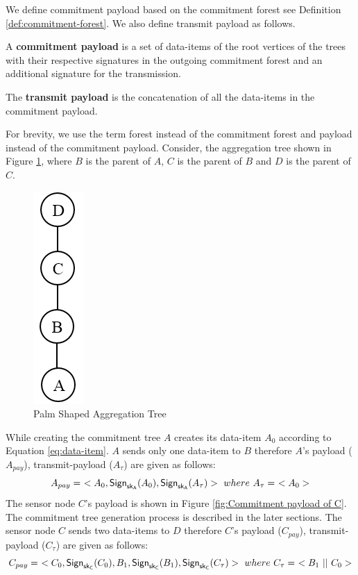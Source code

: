 	We define commitment payload based on the commitment forest see Definition \ref{def:commitment-forest}.
	We also define transmit payload as follows.
	\begin{definition}
		A \textbf{commitment payload} is a set of data-items of the root vertices of the trees with their respective signatures in the outgoing commitment forest and an additional signature for the transmission.
	\end{definition}
	\begin{definition}
		The \textbf{transmit payload} is the concatenation of all the data-items in the commitment payload.
	\end{definition}
	For brevity, we use the term forest instead of the commitment forest and payload instead of the commitment payload.
	Consider, the aggregation tree shown in Figure \ref{fig:Palm aggregation tree}, where $B$ is the parent of $A$, $C$ is the parent of $B$ and $D$ is the parent of $C$. 
	\begin{figure}[h!]
		\centering
		\includegraphics[scale = 1]{images/palm-aggregation-tree.png}
		\caption{Palm Shaped Aggregation Tree}
		\label{fig:Palm aggregation tree}
	\end{figure}
	While creating the commitment tree $A$ creates its data-item $A_{0}$ according to Equation \ref{eq:data-item}.
	$A$ sends only one data-item to $B$ therefore $A$'s payload ($A_{pay}$), transmit-payload ($A_{\tau}$) are given as follows:
	\begin{equation}
		A_{pay} =\ <A_{0}, \textsf{Sign}_{\sk_{A}}(A_{0}), \textsf{Sign}_{\sk_{A}}(A_{\tau}) >\ where\ A_{\tau} =\ < A_{0} > 
		\label{eq:signing-payload}
	\end{equation}
	The sensor node $C$'s payload is shown in Figure \ref{fig:Commitment payload of C}.
	The commitment tree generation process is described in the later sections. 
	The sensor node $C$ sends two data-items to $D$ therefore $C$'s payload ($C_{pay}$), transmit-payload ($C_{\tau}$) are given as follows:
	\begin{equation*}
		 	C_{pay} =\ <C_{0}, \textsf{Sign}_{\sk_{C}}(C_{0}), B_{1}, \textsf{Sign}_{\sk_{C}}(B_{1}), \textsf{Sign}_{\sk_{C}}(C_{\tau}) >\ where\ C_{\tau} =\ <B_{1}\ ||\ C_{0}>
	\end{equation*}

